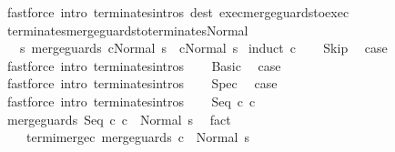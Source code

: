 \begin{isabellebody}
\isamarkupfalse%
\ {\isacharparenleft}fastforce\ intro{\isacharcolon}\ terminates{\isachardot}intros\ dest{\isacharcolon}\ exec{\isacharunderscore}merge{\isacharunderscore}guards{\isacharunderscore}to{\isacharunderscore}exec{\isacharparenright}{\isacharplus}%
\endisatagproof
{\isafoldproof}%
%
\isadelimproof
\isanewline
%
\endisadelimproof
\isanewline
{}\isamarkupfalse%
\ terminates{\isacharunderscore}merge{\isacharunderscore}guards{\isacharunderscore}to{\isacharunderscore}terminates{\isacharunderscore}Normal{\isacharcolon}\isanewline
\ \ \ {\isachardoublequoteopen}{\isasymAnd}s{\isachardot}\ {\isasymGamma}{\isasymturnstile}merge{\isacharunderscore}guards\ c{\isasymdown}Normal\ s\ {\isasymLongrightarrow}\ {\isasymGamma}{\isasymturnstile}c{\isasymdown}Normal\ s{\isachardoublequoteclose}\isanewline
%
\isadelimproof
%
\endisadelimproof
%
\isatagproof
{}\isamarkupfalse%
\ {\isacharparenleft}induct\ c{\isacharparenright}\isanewline
\ \ \isamarkupfalse%
\ Skip\ \isamarkupfalse%
\ {\isacharquery}case\ \isamarkupfalse%
\ {\isacharparenleft}fastforce\ intro{\isacharcolon}\ terminates{\isachardot}intros{\isacharparenright}\isanewline
{}\isamarkupfalse%
\isanewline
\ \ \isamarkupfalse%
\ Basic\ \isamarkupfalse%
\ {\isacharquery}case\ \isamarkupfalse%
\ {\isacharparenleft}fastforce\ intro{\isacharcolon}\ terminates{\isachardot}intros{\isacharparenright}\isanewline
{}\isamarkupfalse%
\isanewline
\ \ \isamarkupfalse%
\ Spec\ \isamarkupfalse%
\ {\isacharquery}case\ \isamarkupfalse%
\ {\isacharparenleft}fastforce\ intro{\isacharcolon}\ terminates{\isachardot}intros{\isacharparenright}\isanewline
{}\isamarkupfalse%
\isanewline
\ \ \isamarkupfalse%
\ {\isacharparenleft}Seq\ c{}\ c{}{\isacharparenright}\ \isanewline
\ \ \isamarkupfalse%
\ {\isachardoublequoteopen}{\isasymGamma}{\isasymturnstile}merge{\isacharunderscore}guards\ {\isacharparenleft}Seq\ c{}\ c{}{\isacharparenright}\ {\isasymdown}\ Normal\ s{\isachardoublequoteclose}\ \isamarkupfalse%
\ fact\isanewline
\ \ \isamarkupfalse%
\ \isamarkupfalse%
\isanewline
\ \ \ \ termi{\isacharunderscore}merge{\isacharunderscore}c{}{\isacharcolon}\ {\isachardoublequoteopen}{\isasymGamma}{\isasymturnstile}merge{\isacharunderscore}guards\ c{}\ {\isasymdown}\ Normal\ s{\isachardoublequoteclose}\ \isanewline

\end{isabellebody}
